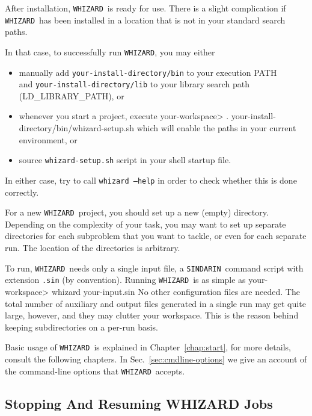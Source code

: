 \documentclass[12pt]{book}
\newenvironment{interaction}%
  {\begingroup\small
   \verbatim}%
  {\endverbatim
   \endgroup\noindent}
\newcommand{\ttt}[1]{\texttt{#1}}
\newcommand{\whizard}{\texttt{WHIZARD}}
\newcommand{\sindarin}{\texttt{SINDARIN}}
\begin{document}
After installation, \whizard\ is ready for use.  There is a slight
complication if \whizard\ has been installed in a location that is not
in your standard search paths.

In that case, to successfully run \whizard, you may either 
\begin{itemize}
\item
  manually add \ttt{your-install-directory/bin} to your execution PATH\\
  and \ttt{your-install-directory/lib} to your library search path
  (LD\_LIBRARY\_PATH), or
\item
  whenever you start a project, execute
  \begin{interaction}
    your-workspace> . your-install-directory/bin/whizard-setup.sh
  \end{interaction}
  which will enable the paths in your current environment, or
\item
  source \ttt{whizard-setup.sh} script in your shell startup file.
\end{itemize}
In either case, try to call \ttt{whizard --help} in order to check
whether this is done correctly.

For a new \whizard\ project, you should set up a new (empty)
directory.  Depending on the complexity of your task, you may want to
set up separate directories for each subproblem that you want to
tackle, or even for each separate run.  The location of the
directories is arbitrary.

To run, \whizard\ needs only a single input file, a \sindarin\ command
script with extension \ttt{.sin} (by convention).  Running
\whizard\ is as simple as
\begin{interaction}
  your-workspace> whizard your-input.sin
\end{interaction}
No other configuration files are needed.  The total number of
auxiliary and output files generated in a single run may get quite
large, however, and they may clutter your workspace.  This is the
reason behind keeping subdirectories on a per-run basis.

Basic usage of \whizard\ is explained in Chapter~\ref{chap:start}, for
more details, consult the following chapters.  In
Sec.~\ref{sec:cmdline-options} we give an account of the command-line
options that \whizard\ accepts.


\subsection{Stopping And Resuming WHIZARD Jobs}
\end{document}
